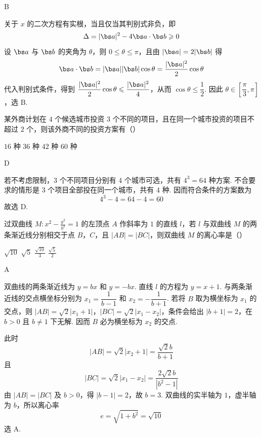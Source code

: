\begin{answer}
B
\end{answer}

\begin{solution}
关于 \(x\) 的二次方程有实根，当且仅当其判别式非负，即
\[
\Delta=|\bs a|^2-4\bs a\cdot\bs b\geqslant0
\]
设 \(\bs a\) 与 \(\bs b\) 的夹角为 \(\theta\)，则 \(0\leqslant\theta\leqslant\pi\)，且由 \(|\bs a|=2|\bs b|\) 得
\[
\bs a\cdot\bs b=|\bs a||\bs b|\cos\theta=\frac{|\bs a|^2}{2}\cos\theta
\]
代入判别式条件，得到 \(\dfrac{|\bs a|^2}{2}\cos\theta\leqslant\dfrac{|\bs a|^2}{4}\)，从而 \(\cos\theta\leqslant\dfrac12\). 因此 \(\theta\in\left[\dfrac\pi3,\pi\right]\)，选 B.
\end{solution}

\begin{problem}
某外商计划在 \(4\) 个候选城市投资 \(3\) 个不同的项目，且在同一个城市投资的项目不超过 \(2\) 个，则该外商不同的投资方案有（\quad）

\choices
    {\(16\) 种}
    {\(36\) 种}
    {\(42\) 种}
    {\(60\) 种}
\end{problem}

\begin{answer}
D
\end{answer}

\begin{solution}
若不考虑限制，3 个不同项目分别有 4 个城市可选，共有 \(4^3=64\) 种方案. 不合要求的情形是 3 个项目全部投在同一个城市，共有 4 种. 因而符合条件的方案数为
\[
4^3-4=64-4=60
\]
故选 D.
\end{solution}

\begin{problem}
过双曲线 \(M: x^{2} - \frac{y^{2}}{b^{2}} = 1\) 的左顶点 \(A\) 作斜率为 \(1\) 的直线 \(l\)，若 \(l\) 与双曲线 \(M\) 的两条渐近线分别相交于点 \(B\)，\(C\)，且 \(|AB| = |BC|\)，则双曲线 \(M\) 的离心率是（\quad）

\choices
    {\(\sqrt{10}\)}
    {\(\sqrt{5}\)}
    {\(\frac{\sqrt{10}}{3}\)}
    {\(\frac{\sqrt{5}}{2}\)}
\end{problem}

\begin{answer}
A
\end{answer}

\begin{solution}
双曲线的两条渐近线为 \(y=bx\) 和 \(y=-bx\). 直线 \(l\) 的方程为 \(y=x+1\). 与两条渐近线的交点横坐标分别为 \(x_1=\dfrac1{b-1}\) 和 \(x_2=-\dfrac1{b+1}\).
若将 \(B\) 取为横坐标为 \(x_1\) 的交点，则 \(|AB|=\sqrt2|x_1+1|\)，\(|BC|=\sqrt2|x_1-x_2|\)，条件会给出 \(|b+1|=2\)，在 \(b>0\) 且 \(b\ne1\) 下无解. 因而 \(B\) 必为横坐标为 \(x_2\) 的交点.

此时
\[
|AB|=\sqrt2\left|x_2+1\right|=\frac{\sqrt2 b}{b+1}
\]
且
\[
|BC|=\sqrt2|x_1-x_2|=\frac{2\sqrt2 b}{|b^2-1|}
\]
由 \(|AB|=|BC|\) 及 \(b>0\)，得 \(|b-1|=2\)，故 \(b=3\). 双曲线的实半轴为 \(1\)，虚半轴为 \(b\)，所以离心率
\[
e=\sqrt{1+b^2}=\sqrt{10}
\]
选 A.
\end{solution}

